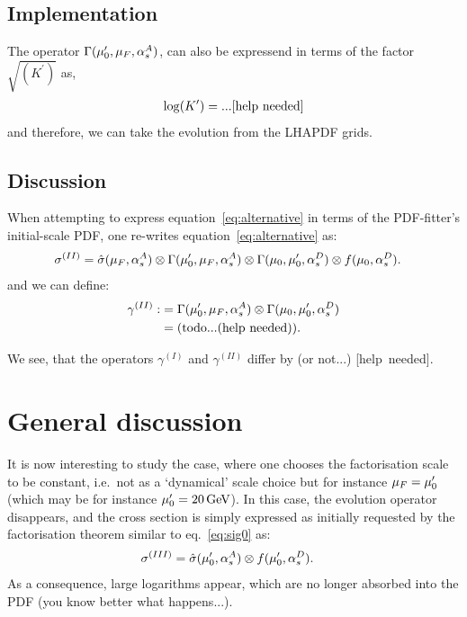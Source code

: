 \documentclass[12pt]{article}
\begin{document}
\subsection{Implementation}
The operator $\Gamma(\mu_0^\prime,\mu_{F},\alpha_s^A)$, can also be expressend in terms of the factor $\sqrt{(K^\prime)}$ as,
\begin{align}
  \log(K^\prime) = \rm... [help~needed]
\label{eq:kappaprime}
\end{align}
and therefore, we can take the evolution from the LHAPDF grids.

\subsection{Discussion}
When attempting to express equation~\ref{eq:alternative} in terms of the PDF-fitter's initial-scale PDF,
one re-writes equation~\ref{eq:alternative} as:
\begin{align}
  \sigma^{(II)} &= \hat\sigma(\mu_{F},\alpha_s^A) \otimes \Gamma(\mu_0^\prime,\mu_{F},\alpha_s^A) \otimes \Gamma(\mu_0,\mu_0^\prime,\alpha_s^D) \otimes f(\mu_0,\alpha_s^D).
\end{align}
and we can define:
\begin{align}
  \gamma^{(II)} :&= \Gamma(\mu_0^\prime,\mu_{F},\alpha_s^A) \otimes \Gamma(\mu_0,\mu_0^\prime,\alpha_s^D) \\
                 &= \rm(todo... (help~needed)).
\end{align}

We see, that the operators $\gamma^{(I)}$ and $\gamma^{(II)}$ differ by (or not...) [help~needed].



\section{General discussion}
It is now interesting to study the case, where one chooses the factorisation scale to be constant,
i.e.\ not as a `dynamical' scale choice but for instance $\mu_{F}=\mu_0^\prime$ (which may be for instance $\mu_0^\prime=20\,\mathrm{GeV}$).
In this case, the evolution operator disappears, and the cross section is simply expressed as 
initially requested by the factorisation theorem similar to eq.~\ref{eq:sig0} as:
\begin{align}
  \sigma^{(III)} &= \hat\sigma(\mu_0^\prime,\alpha_s^A) \otimes f(\mu_0^\prime,\alpha_s^D).
  \label{eq:sigIII}
\end{align}
As a consequence, large logarithms appear, which are no longer absorbed into the PDF (you know better what happens...).
\end{document}
